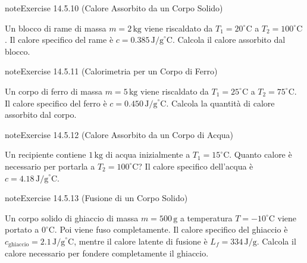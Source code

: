 \documentclass[letterpaper,10pt,italian]{jupyterBook}
\begin{document}
\begin{sphinxadmonition}{note}{Exercise 14.5.10 (Calore Assorbito da un Corpo Solido)}



\sphinxAtStartPar
Un blocco di rame di massa \(m = 2 \, \text{kg}\) viene riscaldato da \(T_1 = 20^\circ \text{C}\) a \(T_2 = 100^\circ \text{C}\). Il calore specifico del rame è \(c = 0.385 \, \text{J/g}^\circ \text{C}\). Calcola il calore assorbito dal blocco.
\end{sphinxadmonition}
 \label{exercise:ch/thermodynamics/foundation-problems-exercise-10}

\begin{sphinxadmonition}{note}{Exercise 14.5.11 (Calorimetria per un Corpo di Ferro)}



\sphinxAtStartPar
Un corpo di ferro di massa \(m = 5 \, \text{kg}\) viene riscaldato da \(T_1 = 25^\circ \text{C}\) a \(T_2 = 75^\circ \text{C}\). Il calore specifico del ferro è \(c = 0.450 \, \text{J/g}^\circ \text{C}\). Calcola la quantità di calore assorbito dal corpo.
\end{sphinxadmonition}
 \label{exercise:ch/thermodynamics/foundation-problems-exercise-11}

\begin{sphinxadmonition}{note}{Exercise 14.5.12 (Calore Assorbito da un Corpo di Acqua)}



\sphinxAtStartPar
Un recipiente contiene \(1 \, \text{kg}\) di acqua inizialmente a \(T_1 = 15^\circ \text{C}\). Quanto calore è necessario per portarla a \(T_2 = 100^\circ \text{C}\)? Il calore specifico dell’acqua è \(c = 4.18 \, \text{J/g}^\circ \text{C}\).
\end{sphinxadmonition}
 \label{exercise:ch/thermodynamics/foundation-problems-exercise-12}

\begin{sphinxadmonition}{note}{Exercise 14.5.13 (Fusione di un Corpo Solido)}



\sphinxAtStartPar
Un corpo solido di ghiaccio di massa \(m = 500 \, \text{g}\) a temperatura \(T = -10^\circ \text{C}\) viene portato a \(0^\circ \text{C}\). Poi viene fuso completamente. Il calore specifico del ghiaccio è \(c_{\text{ghiaccio}} = 2.1 \, \text{J/g}^\circ \text{C}\), mentre il calore latente di fusione è \(L_f = 334 \, \text{J/g}\). Calcola il calore necessario per fondere completamente il ghiaccio.
\end{sphinxadmonition}
 \label{exercise:ch/thermodynamics/foundation-problems-exercise-13}
\end{document}
